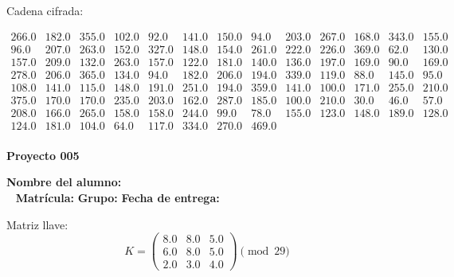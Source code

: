 \documentclass[12pt]{article}
\begin{document}
Cadena cifrada:
\begin{center}
$\begin{array}{lllllllllllll}
266.0 & 182.0 & 355.0 & 102.0 & 92.0 & 141.0 & 150.0 & 94.0 & 203.0 & 267.0 & 168.0 & 343.0 & 155.0\\
96.0 & 207.0 & 263.0 & 152.0 & 327.0 & 148.0 & 154.0 & 261.0 & 222.0 & 226.0 & 369.0 & 62.0 & 130.0\\
157.0 & 209.0 & 132.0 & 263.0 & 157.0 & 122.0 & 181.0 & 140.0 & 136.0 & 197.0 & 169.0 & 90.0 & 169.0\\
278.0 & 206.0 & 365.0 & 134.0 & 94.0 & 182.0 & 206.0 & 194.0 & 339.0 & 119.0 & 88.0 & 145.0 & 95.0\\
108.0 & 141.0 & 115.0 & 148.0 & 191.0 & 251.0 & 194.0 & 359.0 & 141.0 & 100.0 & 171.0 & 255.0 & 210.0\\
375.0 & 170.0 & 170.0 & 235.0 & 203.0 & 162.0 & 287.0 & 185.0 & 100.0 & 210.0 & 30.0 & 46.0 & 57.0\\
208.0 & 166.0 & 265.0 & 158.0 & 158.0 & 244.0 & 99.0 & 78.0 & 155.0 & 123.0 & 148.0 & 189.0 & 128.0\\
124.0 & 181.0 & 104.0 & 64.0 & 117.0 & 334.0 & 270.0 & 469.0\\
\end{array}$
\end{center}

\newpage


\textbf{Proyecto 005}

\textbf{Nombre del alumno:} \underline{\hspace{13cm}}\\\
\vspace{1cm}
\textbf{Matrícula:} \underline{\hspace{4cm}} \hspace{1cm}
\textbf{Grupo:} \underline{\hspace{2cm}}
\textbf{Fecha de entrega:} \underline{\hspace{2cm}}

\medskip

Matriz llave:
\[
K = \begin{pmatrix}
8.0 & 8.0 & 5.0\\
6.0 & 8.0 & 5.0\\
2.0 & 3.0 & 4.0
\end{pmatrix} \pmod{29}
\]
\end{document}
